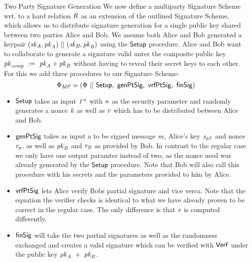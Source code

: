 \begin{definition}{Two Party Signature Generation}
    \label{def:twoPartySig}
    We now define a multiparty Signature Scheme wrt. to a hard relation $\mathit{R}$ as an extension of the outlined Signature Scheme,
    which allows us to distribute signature generation for a single public key shared between two parties Alice and Bob. We assume both Alice and Bob generated a keypair $(\mathit{sk}_{\mathit{A}}, \mathit{pk}_{\mathit{A}}) ~||~ (\mathit{sk}_{\mathit{B}}, \mathit{pk}_{\mathit{B}})$
    using the $\mathsf{Setup}$ procedure. Alice and Bob want to collaborate to generate a signature valid unter the composite public key $\mathit{pk}_{\mathit{comp}} ~:=~ \mathit{pk}_{\mathit{A}} + \mathit{pk}_{\mathit{B}}$ without
    having to reveal their secret keys to each other. For this we add three procedures to our Signature Scheme:
    \[ \Phi_{\mathit{MP}} = (\Phi ~||~ \mathsf{Setup} ,~ \mathsf{genPtSig} ,~ \mathsf{vrfPtSig} ,~ \mathsf{finSig}) \]
    \begin{itemize}
        \item $\mathsf{Setup}$ takes as input $\mathit{1^n}$ with $\mathit{n}$ as the security parameter and randomly generates a nonce $\mathit{k}$ as well as $\mathit{r}$ which has to be distributed
        between Alice and Bob.
        \item $\mathsf{genPtSig}$ takes as input a to be signed message $\mathit{m}$, Alice's key $\mathit{x}_{\mathit{p2}}$ and nonce $\mathit{r}_{\mathit{p}}$. as well as $\mathit{pk}_{\mathit{B}}$ and $\mathit{r}_{\mathit{B}}$ as provided
        by Bob. In contrast to the regular case we only have one output paramter instead of two, as the nonce used was already generated by the $\mathsf{Setup}$ procedure.
        Note that Bob will also call this procedure with his secrets and the parameters provided to him by Alice.
        \item $\mathsf{vrfPtSig}$ lets Alice verify Bobs partial signature and vice verca. Note that the equation the verifier checks is identical to what we have already proven to be correct in the regular
        case. The only difference is that $\mathit{e}$ is computed differently.
        \item $\mathsf{finSig}$ will take the two partial signatures as well as the randomness exchanged and creates a valid signature which can be verified with $\mathsf{Verf}$ under the public key
        $\mathit{pk}_{\mathit{A}} ~+~ \mathit{pk}_{\mathit{B}}$.
    \end{itemize}
\end{definition}

